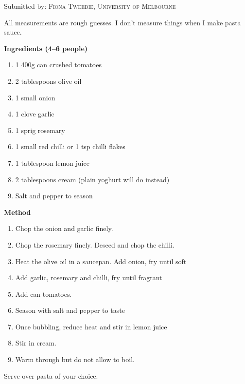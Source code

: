 

Submitted by: \textsc{Fiona Tweedie, University of Melbourne}


\begin{shadequote*}
All measurements are rough guesses. I don't measure things when I make pasta sauce.
\end{shadequote*}
\hrulefill

\textbf{Ingredients (4--6 people)}

\begin{enumerate}[before=\itshape,font=\normalfont]
    \item 1 400g can crushed tomatoes
    \item 2 tablespoons olive oil
    \item 1 small onion
    \item 1 clove garlic
    \item 1 sprig rosemary
    \item 1 small red chilli or 1 tsp chilli flakes
    \item  1 tablespoon lemon juice
    \item 2 tablespoons cream (plain yoghurt will do instead)
    \item Salt and pepper to season
\end{enumerate}

\hrulefill

\textbf{Method}
\begin{enumerate}
    \item Chop the onion and garlic finely.
    \item Chop the rosemary finely. Deseed and chop the chilli.
    \item Heat the olive oil in a saucepan. Add onion, fry until soft
    \item Add garlic, rosemary and chilli, fry until fragrant
    \item Add can tomatoes.
    \item Season with salt and pepper to taste
    \item Once bubbling, reduce heat and stir in lemon juice
    \item Stir in cream.
    \item Warm through but do not allow to boil.
\end{enumerate}

Serve over pasta of your choice.


\vfill
\pagebreak
